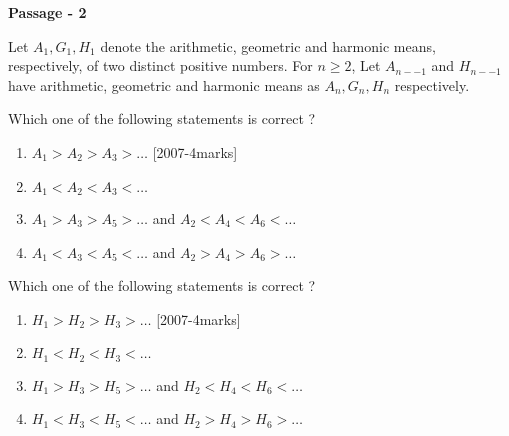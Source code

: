 \iffalse
\title{Assignment1}
\author{DULLA KARTHIK}
\section{paragraph}
\fi 
\item \textbf{Passage - 2} 

Let $A_{1}, G_{1}, H_{1} $ denote the arithmetic, geometric and harmonic means, respectively, of two distinct positive numbers. For $n\geq 2$, Let $A_{n--1}$ and $H_{n--1}$ have arithmetic, geometric and harmonic means as $A_{n},G_{n},H_{n}$ respectively.

\item Which one of the following statements is correct ?
\begin{enumerate}
    
\item $A_{1}>A_{2}>A_{3}>\dots$ \hfill[2007-4marks]

\item $A_{1}<A_{2}<A_{3}<\dots$

\item $A_{1}>A_{3}>A_{5}>\dots$ and $A_{2}<A_{4}<A_{6}<\dots$

\item $A_{1}<A_{3}<A_{5}<\dots$ and $A_{2}>A_{4}>A_{6}>\dots$
\end{enumerate}

\item Which one of the following statements is correct ?
\begin{enumerate}

 \item $H_{1}>H_{2}>H_{3}>\dots$ \hfill[2007-4marks]

 \item $H_{1}<H_{2}<H_{3}<\dots$

\item $H_{1}>H_{3}>H_{5}>\dots$ and $H_{2}<H_{4}<H_{6}<\dots$

\item $H_{1}<H_{3}<H_{5}<\dots$ and $H_{2}>H_{4}>H_{6}>\dots$
\end{enumerate}
